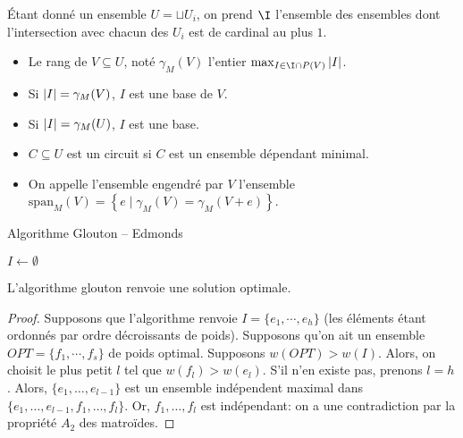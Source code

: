 \documentclass[math, info]{cours}
\begin{document}
\begin{exemple}
	Étant donné un ensemble $U = \sqcup U_{i}$, on prend $\I$ l'ensemble des ensembles dont l'intersection avec chacun des $U_{i}$ est de cardinal au plus $1$.
\end{exemple}

\begin{definition}
	\begin{itemize}
		\item Le rang de $V \subseteq U$, noté $\gamma_{M}(V)$ l'entier $\max_{I \in \I \cap P(V)} \abs{I}$.
		\item Si $\left|I\right| = \gamma_{M}(V)$, $I$ est une base de $V$.
		\item Si $\left|I\right| = \gamma_{M}(U)$, $I$ est une base.
		\item $C \subseteq U$ est un circuit si $C$ est un ensemble dépendant minimal.
		\item On appelle l'ensemble engendré par $V$ l'ensemble $\mathrm{span}_{M}(V) = \left\{e \mid \gamma_{M}(V) = \gamma_{M}(V + e)\right\}$.
	\end{itemize}
\end{definition}


\begin{algorithm}
	\caption{Algorithme Glouton -- Edmonds}
	\begin{algorithmic}
		\State $I \gets \emptyset$
		\EndWhile
	\end{algorithmic}
\end{algorithm}

\begin{thm}
	L'algorithme glouton renvoie une solution optimale.
\end{thm}
\begin{proof}
	Supposons que l'algorithme renvoie $I = \{e_{1}, \cdots, e_{h}\}$ (les éléments étant ordonnés par ordre décroissants de poids).
	Supposons qu'on ait un ensemble $OPT = \{f_{1}, \cdots, f_{s}\}$ de poids optimal.
	Supposons $w(OPT) > w(I)$.
	Alors, on choisit le plus petit $l$ tel que $w(f_{l}) > w(e_{l})$. S'il n'en existe pas, prenons $l = h$.
	Alors, $\{e_{1},\ldots, e_{l - 1}\}$ est un ensemble indépendent maximal dans $\{e_{1}, \ldots, e_{l - 1}, f_{1}, \ldots, f_{l}\}$.
	Or, $f_{1}, \ldots, f_{l}$ est indépendant: on a une contradiction par la propriété $A_{2}$ des matroïdes.
\end{proof}
\end{document}
